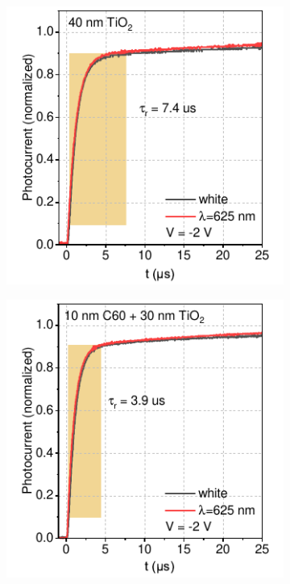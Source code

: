 \begin{figure}[t]
    \centering
    \begin{subfigure}[t]{0.24\textwidth}
        \centering
        \includegraphics[width=\textwidth]{chapters/transport_layers/images/Rise_time_40TiO2.pdf} %
        \caption{}
        \label{}
    \end{subfigure}
    \hfill
    \begin{subfigure}[t]{0.24\textwidth}
        \centering
        \includegraphics[width=\textwidth]{chapters/transport_layers/images/Rise_time_10_30.pdf} 

\end{subfigure}
\end{figure}
